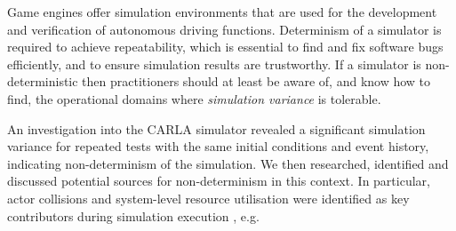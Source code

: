 Game engines offer simulation environments that are used for the development and verification of autonomous driving functions. Determinism of a simulator is required to achieve repeatability, which is essential to find and fix software bugs efficiently, and to ensure simulation results are trustworthy. If a simulator is non-deterministic then practitioners should at least be aware of, and know how to find, the operational domains where \textit{simulation variance} is tolerable. 

An investigation into the CARLA simulator revealed a significant simulation variance for repeated tests with the same initial conditions and event history, indicating non-determinism of the simulation. We then researched, identified and discussed potential sources for non-determinism in this context. 
\DIFdelbegin {}\DIFdelend %
In particular, actor collisions and system-level resource utilisation were identified as key contributors \DIFdelbegin {}\DIFdelend \DIFaddbegin {}\DIFaddend during simulation execution \DIFdelbegin {}\DIFdelend \DIFaddbegin {}\DIFaddend , e.g.\DIFdelbegin {}\DIFdelend \DIFaddbegin {}\DIFaddend 

